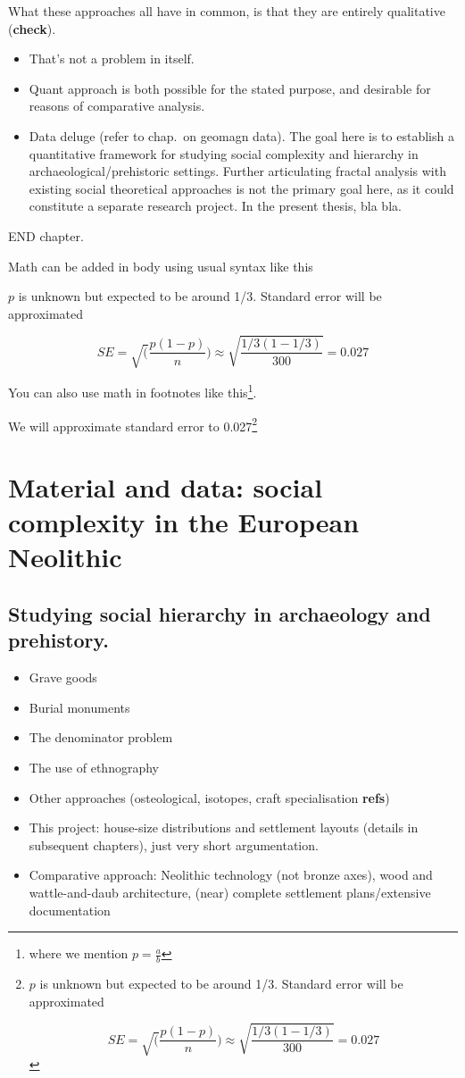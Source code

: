 \documentclass[
  12pt,
]{book}
\begin{document}
What these approaches all have in common, is that they are entirely qualitative (\textbf{check}).

\begin{itemize}
\item
  That's not a problem in itself.
\item
  Quant approach is both possible for the stated purpose, and desirable for reasons of comparative analysis.
\item
  Data deluge (refer to chap.~on geomagn data). The goal here is to establish a quantitative framework for studying social complexity and hierarchy in archaeological/prehistoric settings. Further articulating fractal analysis with existing social theoretical approaches is not the primary goal here, as it could constitute a separate research project. In the present thesis, bla bla.
\end{itemize}

END chapter.

Math can be added in body using usual syntax like this

\(p\) is unknown but expected to be around 1/3. Standard error will be approximated

\[
SE = \sqrt(\frac{p(1-p)}{n}) \approx \sqrt{\frac{1/3 (1 - 1/3)} {300}} = 0.027
\]

You can also use math in footnotes like this\footnote{where we mention \(p = \frac{a}{b}\)}.

We will approximate standard error to 0.027\footnote{\(p\) is unknown but expected to be around 1/3. Standard error will be approximated

  \[
  SE = \sqrt(\frac{p(1-p)}{n}) \approx \sqrt{\frac{1/3 (1 - 1/3)} {300}} = 0.027
  \]}

\hypertarget{material}{%
\chapter{Material and data: social complexity in the European Neolithic}\label{material}}

\hypertarget{complexity-archaeo}{%
\section{Studying social hierarchy in archaeology and prehistory.}\label{complexity-archaeo}}

\begin{itemize}
\item
  Grave goods
\item
  Burial monuments
\item
  The denominator problem
\item
  The use of ethnography
\item
  Other approaches (osteological, isotopes, craft specialisation \textbf{refs})
\item
  This project: house-size distributions and settlement layouts (details in subsequent chapters), just very short argumentation.
\item
  Comparative approach: Neolithic technology (not bronze axes), wood and wattle-and-daub architecture, (near) complete settlement plans/extensive documentation
\end{itemize}
\end{document}
